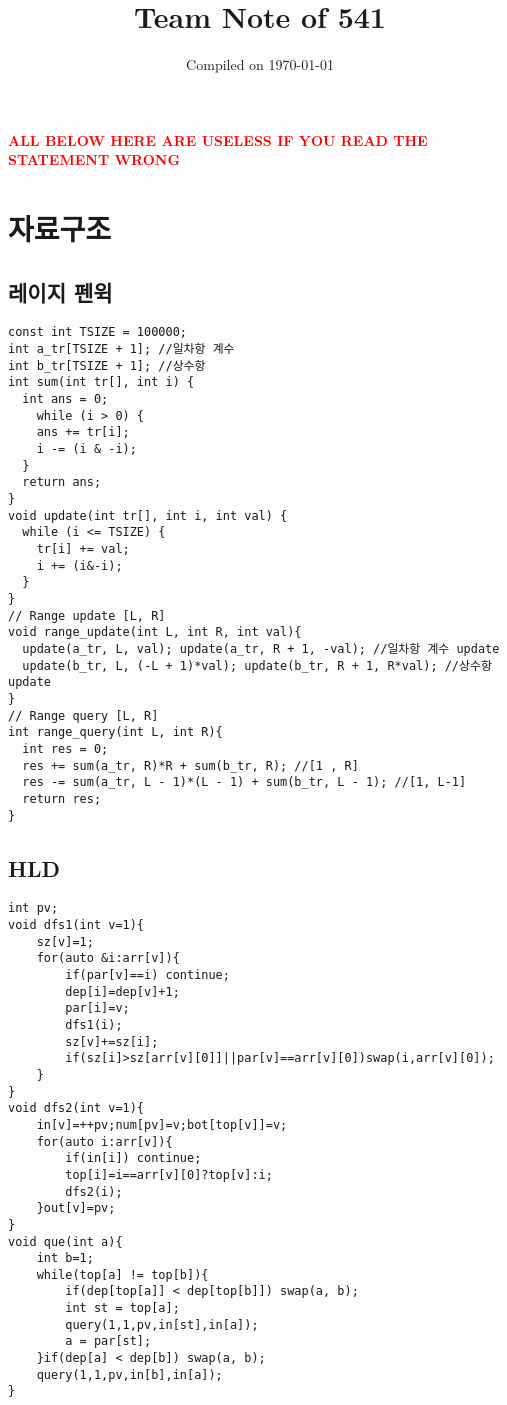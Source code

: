\documentclass[landscape, 8pt, a4paper, oneside, twocolumn]{extarticle}
\title{Team Note of 541}
\author{}
\date{Compiled on \today}
\begin{document}
{
	\Large
	\maketitle
    \tableofcontents
}
\thispagestyle{fancy}
\textcolor{red}{\textbf{ALL BELOW HERE ARE USELESS IF YOU READ THE STATEMENT WRONG}}
\section{자료구조}
\subsection {레이지 펜윅}
\begin{verbatim}
const int TSIZE = 100000;
int a_tr[TSIZE + 1]; //일차항 계수
int b_tr[TSIZE + 1]; //상수항
int sum(int tr[], int i) {
  int ans = 0;
	while (i > 0) {
    ans += tr[i];
    i -= (i & -i);
  }
  return ans;
}
void update(int tr[], int i, int val) {
  while (i <= TSIZE) {
    tr[i] += val;
    i += (i&-i);
  }
}
// Range update [L, R]
void range_update(int L, int R, int val){
  update(a_tr, L, val); update(a_tr, R + 1, -val); //일차항 계수 update
  update(b_tr, L, (-L + 1)*val); update(b_tr, R + 1, R*val); //상수항 update
}
// Range query [L, R]
int range_query(int L, int R){
  int res = 0;
  res += sum(a_tr, R)*R + sum(b_tr, R); //[1 , R]
  res -= sum(a_tr, L - 1)*(L - 1) + sum(b_tr, L - 1); //[1, L-1]
  return res;
}
\end{verbatim}
\subsection {HLD}
\begin{verbatim}
int pv;
void dfs1(int v=1){
    sz[v]=1;
    for(auto &i:arr[v]){
        if(par[v]==i) continue;
        dep[i]=dep[v]+1;
        par[i]=v;
        dfs1(i);
        sz[v]+=sz[i];
        if(sz[i]>sz[arr[v][0]]||par[v]==arr[v][0])swap(i,arr[v][0]);
    }
}
void dfs2(int v=1){
    in[v]=++pv;num[pv]=v;bot[top[v]]=v;
    for(auto i:arr[v]){
        if(in[i]) continue;
        top[i]=i==arr[v][0]?top[v]:i;
        dfs2(i);
    }out[v]=pv;
}
void que(int a){
    int b=1;
    while(top[a] != top[b]){
        if(dep[top[a]] < dep[top[b]]) swap(a, b);
        int st = top[a];
        query(1,1,pv,in[st],in[a]);
        a = par[st];
    }if(dep[a] < dep[b]) swap(a, b);
    query(1,1,pv,in[b],in[a]);
}
\end{verbatim}
\end{document}
